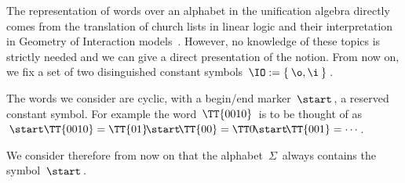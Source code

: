 The representation of words over an alphabet in the unification algebra directly comes from the translation of church lists in linear logic and their interpretation in Geometry of Interaction models~\cite{girard_geometry_1989,girard_geometry_1995}.
However, no knowledge of these topics is strictly needed and we can give a direct presentation of the notion.
\medskip
From now on, we fix a set of two disinguished constant symbols $\,\IO:=\{\:\o,\i\:\}\,$.


The words we consider are cyclic, with a begin/end marker $\,\start\,$, a reserved constant symbol.
For example the word $\,\TT{0010}\,$ is to be thought of as $\,\start\TT{0010}=\TT{01}\!\start\!\TT{00}=\TT0\!\start\!\TT{001}=\cdots\,$.

We consider therefore from now on that the alphabet $\,\Sigma\,$ always contains the symbol $\,\start\,$.


